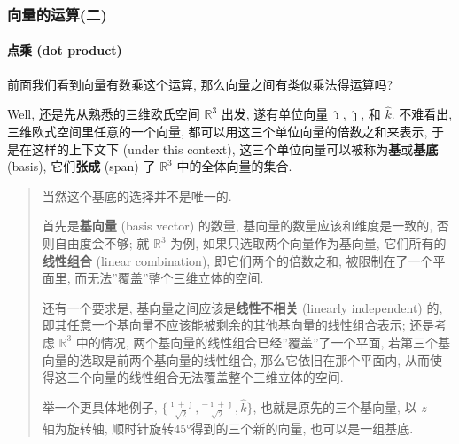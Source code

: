 \hypertarget{ux5411ux91cfux7684ux8fd0ux7b97ux4e8c}{%
\subsubsection{向量的运算(二)}\label{ux5411ux91cfux7684ux8fd0ux7b97ux4e8c}}

\hypertarget{ux70b9ux4e58-dot-product}{%
\paragraph{点乘 (dot product)}\label{ux70b9ux4e58-dot-product}}

前面我们看到向量有数乘这个运算, 那么向量之间有类似乘法得运算吗?

Well, 还是先从熟悉的三维欧氏空间 \(\mathbb{R}^3\) 出发, 遂有单位向量
\(\hat{\imath}\), \(\hat{\jmath}\), 和 \(\hat{k}\). 不难看出,
三维欧式空间里任意的一个向量, 都可以用这三个单位向量的倍数之和来表示,
于是在这样的上下文下 (under this context),
这三个单位向量可以被称为\textbf{基}或\textbf{基底} (basis),
它们\textbf{张成} (span) 了 \(\mathbb{R}^3\) 中的全体向量的集合.

\begin{quote}
当然这个基底的选择并不是唯一的.

首先是\textbf{基向量} (basis vector) 的数量,
基向量的数量应该和维度是一致的, 否则自由度会不够; 就 \(\mathbb{R}^3\)
为例, 如果只选取两个向量作为基向量, 它们所有的\textbf{线性组合} (linear
combination), 即它们两个的倍数之和, 被限制在了一个平面里,
而无法''覆盖''整个三维立体的空间.

还有一个要求是, 基向量之间应该是\textbf{线性不相关} (linearly
independent) 的,
即其任意一个基向量不应该能被剩余的其他基向量的线性组合表示; 还是考虑
\(\mathbb{R}^3\) 中的情况, 两个基向量的线性组合已经''覆盖''了一个平面,
若第三个基向量的选取是前两个基向量的线性组合, 那么它依旧在那个平面内,
从而使得这三个向量的线性组合无法覆盖整个三维立体的空间.

举一个更具体地例子,
\(\{\frac{\hat{\imath}+\hat{\jmath}}{\sqrt{2}},\frac{-\hat{\imath}+\hat{\jmath}}{\sqrt{2}},\hat{k}\}\),
也就是原先的三个基向量, 以 \(z-\)轴为旋转轴,
顺时针旋转45°得到的三个新的向量, 也可以是一组基底.
\end{quote}

